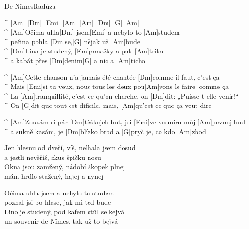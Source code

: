 \begin{song}{De Nîmes}{Radůza}

\begin{guitar}
^ [Am] [Dm] [Emi] [Am] [Am] [Dm] [G] [Am]\\

^ [Am]Očima uhla[Dm] jsem[Emi] a nebylo to [Am]studem \\
^ peřina pohla [Dm]se,[G] nějak už [Am]bude \\
^ [Dm]Lino je studený, [Em]ponožky a pak [Am]triko \\
^ a kabát přes [Dm]denim[G] a nic a [Am]ticho \\
\end{guitar}

\begin{guitar}
^ [Am]Cette chanson n’a jamais été chantée [Dm]comme il faut, c’est ça \\
^ Mais [Emi]si tu veux, nous tous les deux pou[Am]vons le faire, comme ça \\
^ La [Am]tranquillité, c’est ce qu’on cherche, on [Dm]dit: „Puisse-t-elle venir!“ \\
^ On [G]dit que tout est dificile, mais, [Am]qu’est-ce que ça veut dire \\
\end{guitar}

\begin{guitar}
^ [Am]Zouvám si pár [Dm]těžkejch bot, jsi [Emi]ve vesmíru můj [Am]pevnej bod \\
^ a sukně kasám, je [Dm]blízko brod a [G]pryč je, co kdo [Am]zbod \\
\end{guitar}


\begin{guitar}
Jen hlesnu od dveří, víš, nelhala jsem dosud \\
a jestli nevěříš, zkus špičku nosu \\
Okna jsou zamžený, nádobí škopek plnej \\
mám hrdlo stažený, hajej a nynej \\
\end{guitar}

\begin{guitar}
Očima uhla jsem a nebylo to studem \\
poznal jsi po hlase, jak mi teď bude \\
Lino je studený, pod kafem stůl se kejvá \\
un souvenir de Nîmes, tak už to bejvá \\
\end{guitar}


\end{song}
